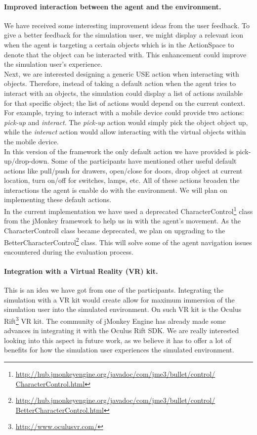 \paragraph{Improved interaction between the agent and the environment.} We have received some interesting improvement ideas from the user feedback. To give a better feedback for the simulation user, we might display a relevant icon when the agent is targeting a certain objects which is in the ActionSpace to denote that the object can be interacted with. This enhancement could improve the simulation user's experience.\\

Next, we are interested designing a generic USE action when interacting with objects. Therefore, instead of taking a default action when the agent tries to interact with an objects, the simulation could display a list of actions available for that specific object; the list of actions would depend on the current context. For example, trying to interact with a mobile device could provide two actions: \emph{pick-up} and \emph{interact}. The \emph{pick-up} action would simply pick the object object up, while the \emph{interact} action would allow interacting with the virtual objects within the mobile device.\\

In this version of the framework the only default action we have provided is pick-up/drop-down. Some of the participants have mentioned other useful default actions like pull/push for drawers, open/close for doors, drop object at current location, turn on/off for switches, lamps, etc. All of these actions broaden the interactions the agent is enable do with the environment. We will plan on implementing these default actions.\\

In the current implementation we have used a deprecated CharacterControl\footnote{\url{http://hub.jmonkeyengine.org/javadoc/com/jme3/bullet/control/
CharacterControl.html}} class from the jMonkey framework to help us in with the agent's movement. As the CharacterControll class became deprecated, we plan on upgrading to the BetterCharacterControl\footnote{\url{http://hub.jmonkeyengine.org/javadoc/com/jme3/bullet/control/
BetterCharacterControl.html}} class. This will solve some of the agent navigation issues encountered during the evaluation process.

\paragraph{Integration with a Virtual Reality (VR) kit.} This is an idea we have got from one of the participants. Integrating the simulation with a VR kit would create allow for maximum immersion of the simulation user into the simulated environment. On such VR kit is the Oculus Rift\footnote{\url{http://www.oculusvr.com/}} VR kit. The community of jMonkey Engine has already made some advances in integrating it with the Oculus Rift SDK. We are really interested looking into this aspect in future work, as we believe it has to offer a lot of benefits for how the simulation user experiences the simulated environment.

